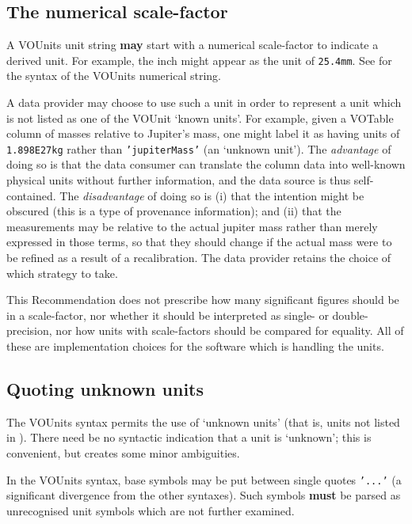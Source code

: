 \documentclass[11pt,notitlepage,onecolumn]{ivoa}
\newcommand*\norm[1]{\textbf{\color{ivoacolor}#1}}
\newcommand{\unit}[1]{\texttt{\small\color{orange}#1}}
\begin{document}
\subsection{The numerical scale-factor}
\label{sec:scalefactor}

A VOUnits unit string \norm{may} start with a numerical scale-factor
to indicate a derived unit.  For example, the inch might appear as the
unit of \unit{25.4mm}.  See  for the syntax
of the VOUnits numerical string.

A data provider may choose to use such a unit in order to represent a
unit which is not listed as one of the VOUnit `known units'.  For
example, given a VOTable column of masses relative to Jupiter's mass,
one might label it as having units of \unit{1.898E27kg} rather than
\unit{'jupiterMass'} (an `unknown unit').
The \emph{advantage} of doing so is that the data consumer can
translate the column data into well-known physical units without further
information, and the data source is thus self-contained.
The \emph{disadvantage} of doing so is (i) that the intention might be
obscured (this is a type of provenance information);
and (ii) that the measurements may be relative to the actual
jupiter mass rather than merely expressed in those terms, so that they
should change if the actual mass were to be refined as a result of
a recalibration.  The data provider retains the choice of which
strategy to take.

This Recommendation does not prescribe how many significant figures
should be in a scale-factor, nor whether it should be interpreted as
single- or double-precision, nor how units with scale-factors should
be compared for equality.  All of these are implementation choices for
the software which is handling the units.

\subsection{Quoting unknown units\label{sec:quoting}}

The VOUnits syntax permits the use of `unknown units' (that is, units not listed
in ).  There need be no syntactic indication that
a unit is `unknown'; this is convenient, but creates some minor
ambiguities.

In the VOUnits syntax, base symbols may be put between single
quotes \unit{'...'} (a significant divergence from the other
syntaxes).  Such symbols \norm{must} be parsed as
unrecognised unit symbols which are not further examined.
\end{document}
